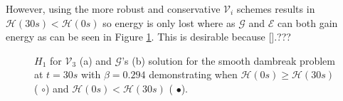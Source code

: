 \documentclass[SingleSpace,12pt,Journal]{Serre_ASCE}
\begin{document}
However, using the more robust and conservative $\mathcal{V}_i$ schemes results in $\mathcal{H}(30s) < \mathcal{H}(0s)$ so energy is only lost where as $\mathcal{G}$ and $\mathcal{E}$ can both gain energy as can be seen in Figure \ref{fig:o3a4dxHallsign}. This is desirable because [].???
\begin{figure}
\centering
{}
\caption{$H_1$ for $\mathcal{V}_3$ (a) and $\mathcal{G}$'s (b) solution for the smooth dambreak problem at $t = 30s$ with $\beta = 0.294$ demonstrating when $\mathcal{H}(0s) \ge \mathcal{H}(30s)$ ({\color{red} $\circ$}) and $\mathcal{H}(0s) < \mathcal{H}(30s)$ ({\color{blue} $\bullet$}).}
\label{fig:o3a4dxHallsign}
\end{figure}
\end{document}
